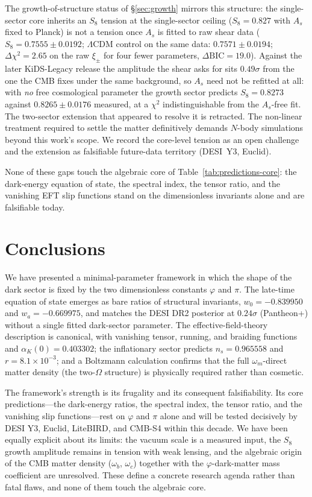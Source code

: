 \documentclass[aps,prd,preprint,amsmath,amssymb,nofootinbib,longbibliography]{revtex4-2}
\begin{document}
The growth-of-structure status of \S\ref{sec:growth} mirrors this structure:
the single-sector core inherits an $S_8$ tension at the single-sector ceiling
($S_8=0.827$ with $A_s$ fixed to Planck) is not a tension once $A_s$ is fitted
to raw shear data ($S_8=0.7555\pm0.0192$; $\Lambda$CDM control on the same data: $0.7571\pm0.0194$; $\Delta\chi^2=2.65$ on the raw $\xi_\pm$ for four fewer parameters, $\Delta\mathrm{BIC}=19.0$). Against the later KiDS-Legacy release the amplitude the shear asks for sits $0.49\sigma$ from the one the CMB fixes under the same background, so $A_s$ need not be refitted at all: with \emph{no} free cosmological parameter the growth sector predicts $S_8=0.8273$ against $0.8265\pm0.0176$ measured, at a $\chi^2$ indistinguishable from the $A_s$-free fit. The two-sector
extension that appeared to resolve it is retracted. The non-linear treatment required to settle the matter
definitively demands $N$-body simulations beyond this work's scope. We record
the core-level tension as an open challenge and the extension as falsifiable
future-data territory (DESI~Y3, Euclid).

None of these gaps touch the algebraic core of
Table~\ref{tab:predictions-core}: the dark-energy equation of state, the
spectral index, the tensor ratio, and the vanishing EFT slip functions stand on
the dimensionless invariants alone and are falsifiable today.

\section{Conclusions}
\label{sec:conclusions}

We have presented a minimal-parameter framework in which the shape of the dark
sector is fixed by the two dimensionless constants $\varphi$ and $\pi$. The
late-time equation of state emerges as bare ratios of structural invariants,
$w_0=-0.839950$ and $w_a=-0.669975$, and matches the DESI DR2 posterior at
$0.24\sigma$ (Pantheon+) without a single fitted dark-sector parameter. The
effective-field-theory description is canonical, with vanishing tensor, running,
and braiding functions and $\alpha_K(0)=0.403302$; the inflationary sector
predicts $n_s=0.965558$ and $r=8.1\times10^{-3}$; and a Boltzmann calculation
confirms that the full $\omega_m$-direct matter density (the two-$\Omega$
structure) is physically required rather than cosmetic.

The framework's strength is its frugality and its consequent falsifiability.
Its core predictions---the dark-energy ratios, the spectral index, the tensor
ratio, and the vanishing slip functions---rest on $\varphi$ and $\pi$ alone and
will be tested decisively by DESI Y3, Euclid, LiteBIRD, and CMB-S4 within this
decade. We have been equally explicit about its limits: the vacuum scale is a
measured input, the $S_8$ growth amplitude remains in tension with weak lensing,
and the algebraic origin of the CMB matter density ($\omega_b$, $\omega_c$)
together with the $\varphi$-dark-matter mass coefficient are unresolved. These
define a concrete research agenda rather than fatal flaws, and none of them
touch the algebraic core.
\end{document}

